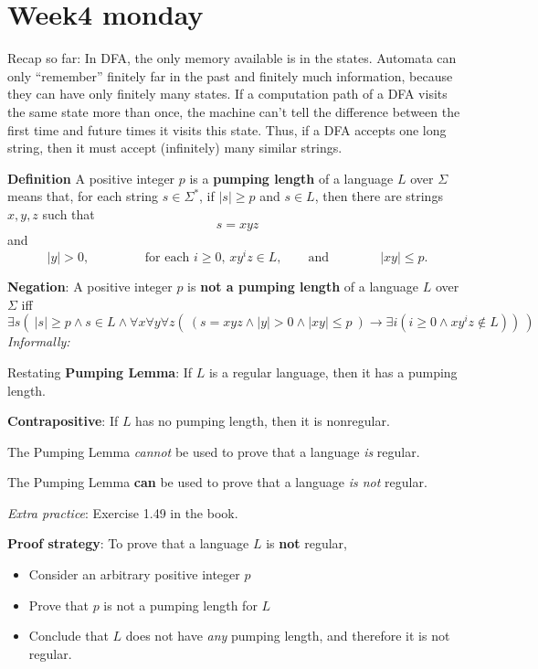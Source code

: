 \documentclass[12pt, oneside]{article}
\begin{document}
\begin{flushright}
\end{flushright} \section*{Week4 monday}


Recap so far: In DFA, the only memory available is in the states. Automata can only
``remember'' finitely far in the past and finitely much information, because
they can have only finitely many states. If a computation path of a DFA visits 
the same state more than once, the machine can't tell the difference between 
the first time and future times it visits this state. Thus, if 
a DFA accepts one long string, then it must accept (infinitely) many 
similar strings.

{\bf Definition}  A positive integer $p$ is a {\bf pumping length} of a language $L$ over $\Sigma$ means
that, for each string $s  \in  \Sigma^*$, if  $|s| \geq p$ and $s \in L$, then there are strings $x,y,z$
such that 
\[
s = xyz
\]
and  
\[
|y| > 0,  \qquad \qquad 
\text{ for each $i \geq 0$, $xy^i z \in L$}, \qquad \text{and}
\qquad  \qquad
|xy| \leq p.
\]

{\bf Negation}: A positive integer  $p$  is {\bf not a pumping length} of a language  $L$ over  $\Sigma$  iff
\[
\exists s \left(~  |s| \geq  p \wedge s \in L \wedge \forall x \forall y \forall z  \left( ~\left( s = xyz \wedge 
|y| > 0 \wedge |xy| \leq p~ \right) \to \exists i  (  i \geq 0  \wedge xy^iz  \notin L ) \right) ~\right) 
\]
{\it Informally: }


Restating {\bf Pumping Lemma}: If $L$ is a regular language, then it  has
a pumping length.


{\bf Contrapositive}: If $L$ has no pumping length, then  it is nonregular.

\vfill

{\Large The Pumping Lemma {\it cannot} be used to prove that a language {\it is} regular.} 

{\Large The Pumping Lemma {\bf can} be used to prove that a language {\it is not} regular.}

{\it Extra practice}: Exercise 1.49 in the book.


\vfill

{\bf Proof strategy}: To prove that a language $L$ is {\bf not} regular, 
\begin{itemize}
    \item Consider an arbitrary positive integer $p$
    \item Prove that $p$ is not a pumping length for $L$
    \item Conclude that $L$ does not have {\it any} pumping length, and therefore it is not regular.
\end{itemize}
\end{document}
